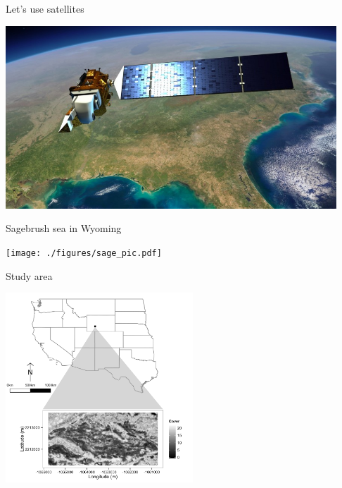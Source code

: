\documentclass[14pt, compress, aspectratio=1610]{beamer}
\let\OldTexttt\texttt
\renewcommand{\texttt}[1]{\OldTexttt{\color{plTT}#1}}
\begin{document}
\begin{frame}{%
\protect\hypertarget{lets-use-satellites}{%
Let’s use satellites}}

\centering

\includegraphics[height=2.7in]{./figures/landsat8.jpg}

\end{frame}

\begin{frame}{%
\protect\hypertarget{sagebrush-sea-in-wyoming}{%
Sagebrush sea in Wyoming}}

\centering

\texttt{[image: ./figures/sage\_pic.pdf]}

\end{frame}

\begin{frame}{%
\protect\hypertarget{study-area}{%
Study area}}

\centering

\includegraphics[height=2.8in]{./figures/studyarea_map.png}

\end{frame}
\end{document}
